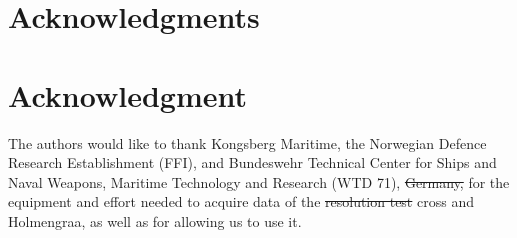 \documentclass[10pt,journal,draftclsnofoot,onecolumn]{IEEEtran}
\newcommand\1{\vec 1}
\providecommand{\DIFdel}[1]{{\protect\color{red}\sout{#1}}}                      %
\providecommand{\DIFdelbegin}{} %
\providecommand{\DIFdelend}{} %
\begin{document}
\ifCLASSOPTIONcompsoc
  \section*{Acknowledgments}
\else
  \section*{Acknowledgment}
\fi

The authors would like to thank Kongsberg Maritime, the Norwegian Defence Research Establishment (FFI), and Bundeswehr Technical Center for Ships and Naval Weapons, Maritime Technology and Research (WTD 71), \DIFdelbegin \DIFdel{Germany, }\DIFdelend for the equipment and effort needed to acquire data of the \DIFdelbegin \DIFdel{resolution test }\DIFdelend cross and Holmengraa, as well as for allowing us to use it.


\ifCLASSOPTIONcaptionsoff
  \newpage
\fi

\DIFdelbegin %
\DIFdelend 
\DIFdelbegin %

\end{document}
